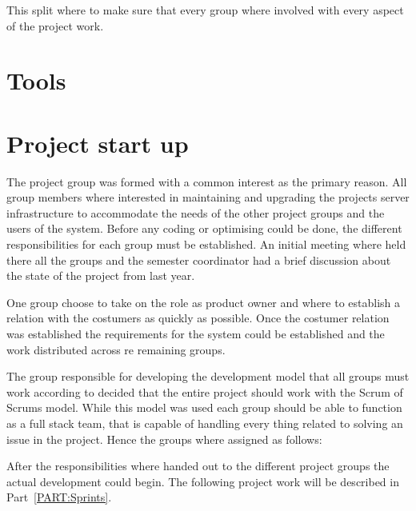 This split where to make sure that every group where involved with every aspect of the project work.

\section{Tools}

\section{Project start up}
The project group was formed with a common interest as the primary reason. 
All group members where interested in maintaining and upgrading the projects server infrastructure to accommodate the needs of the other project groups and the users of the system. 
Before any coding or optimising could be done, the different responsibilities for each group must be established. 
An initial meeting where held there all the groups and the semester coordinator had a brief discussion about the state of the project from last year. 

One group choose to take on the role as product owner and where to establish a relation with the costumers as quickly as possible. 
Once the costumer relation was established the requirements for the system could be established and the work distributed across re remaining groups.

The group responsible for developing the development model that all groups must work according to decided that the entire project should work with the Scrum of Scrums model.
While this model was used each group should be able to function as a full stack team, that is capable of handling every thing related to solving an issue in the project.
Hence the groups where assigned as follows:

After the responsibilities where handed out to the different project groups the actual development could begin.
The following project work will be described in Part~\ref{PART:Sprints}.